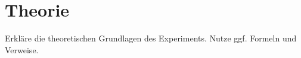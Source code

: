 \section{Theorie}
Erkläre die theoretischen Grundlagen des Experiments. Nutze ggf. Formeln und Verweise.